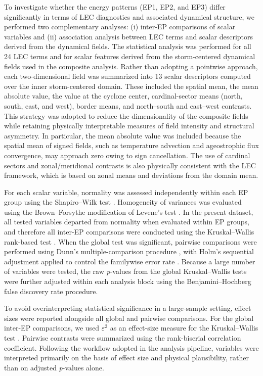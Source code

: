 \documentclass[pdflatex,sn-chicago]{sn-jnl}%
\theoremstyle{plain}
\theoremstyle{definition}
\theoremstyle{remark}
\theoremstyle{definition}
\begin{document}
To investigate whether the energy patterns (EP1, EP2, and EP3) differ significantly in terms of LEC diagnostics and associated dynamical structure, we performed two complementary analyses: (i) inter-EP comparisons of scalar variables and (ii) association analysis between LEC terms and scalar descriptors derived from the dynamical fields. The statistical analysis was performed for all 24 LEC terms and for scalar features derived from the storm-centered dynamical fields used in the composite analysis. Rather than adopting a pointwise approach, each two-dimensional field was summarized into 13 scalar descriptors computed over the inner storm-centered domain. These included the spatial mean, the mean absolute value, the value at the cyclone center, cardinal-sector means (north, south, east, and west), border means, and north--south and east--west contrasts. This strategy was adopted to reduce the dimensionality of the composite fields while retaining physically interpretable measures of field intensity and structural asymmetry. In particular, the mean absolute value was included because the spatial mean of signed fields, such as temperature advection and ageostrophic flux convergence, may approach zero owing to sign cancellation. The use of cardinal sectors and zonal/meridional contrasts is also physically consistent with the LEC framework, which is based on zonal means and deviations from the domain mean.

For each scalar variable, normality was assessed independently within each EP group using the Shapiro--Wilk test \citep{shapiro1965analysis}. Homogeneity of variances was evaluated using the Brown--Forsythe modification of Levene's test \citep{brown1974robust}. In the present dataset, all tested variables departed from normality when evaluated within EP groups, and therefore all inter-EP comparisons were conducted using the Kruskal--Wallis rank-based test \citep{kruskal1952use}. When the global test was significant, pairwise comparisons were performed using Dunn's multiple-comparison procedure \citep{dunn1964multiple}, with Holm's sequential adjustment applied to control the familywise error rate \citep{holm1979simple}. Because a large number of variables were tested, the raw \emph{p}-values from the global Kruskal--Wallis tests were further adjusted within each analysis block using the Benjamini--Hochberg false discovery rate procedure.

To avoid overinterpreting statistical significance in a large-sample setting, effect sizes were reported alongside all global and pairwise comparisons. For the global inter-EP comparisons, we used \(\varepsilon^2\) as an effect-size measure for the Kruskal--Wallis test \citep{kruskal1952use}. Pairwise contrasts were summarized using the rank-biserial correlation coefficient. Following the workflow adopted in the analysis pipeline, variables were interpreted primarily on the basis of effect size and physical plausibility, rather than on adjusted \emph{p}-values alone. 
\end{document}
